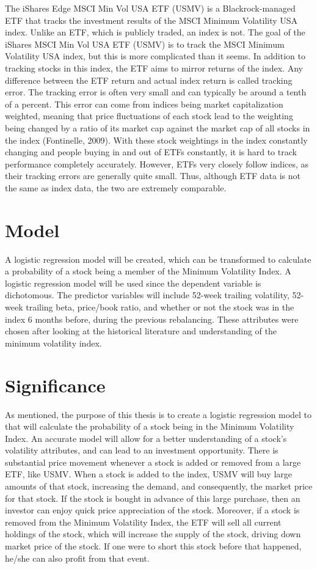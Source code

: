 \documentclass[12pt,twoside]{reedthesis}
\theoremstyle{definition}
\theoremstyle{definition}
\theoremstyle{definition}
\theoremstyle{remark}
\begin{document}
The iShares Edge MSCI Min Vol USA ETF (USMV) is a Blackrock-managed ETF
that tracks the investment results of the MSCI Minimum Volatility USA
index. Unlike an ETF, which is publicly traded, an index is not. The
goal of the iShares MSCI Min Vol USA ETF (USMV) is to track the MSCI
Minimum Volatility USA index, but this is more complicated than it
seems. In addition to tracking stocks in this index, the ETF aims to
mirror returns of the index. Any difference between the ETF return and
actual index return is called tracking error. The tracking error is
often very small and can typically be around a tenth of a percent. This
error can come from indices being market capitalization weighted,
meaning that price fluctuations of each stock lead to the weighting
being changed by a ratio of its market cap against the market cap of all
stocks in the index (Fontinelle, 2009). With these stock weightings in
the index constantly changing and people buying in and out of ETFs
constantly, it is hard to track performance completely accurately.
However, ETFs very closely follow indices, as their tracking errors are
generally quite small. Thus, although ETF data is not the same as index
data, the two are extremely comparable.

\section{Model}\label{model}

A logistic regression model will be created, which can be transformed to
calculate a probability of a stock being a member of the Minimum
Volatility Index. A logistic regression model will be used since the
dependent variable is dichotomous. The predictor variables will include
52-week trailing volatility, 52-week trailing beta, price/book ratio,
and whether or not the stock was in the index 6 months before, during
the previous rebalancing. These attributes were chosen after looking at
the historical literature and understanding of the minimum volatility
index.

\section{Significance}\label{significance}

As mentioned, the purpose of this thesis is to create a logistic
regression model to that will calculate the probability of a stock being
in the Minimum Volatility Index. An accurate model will allow for a
better understanding of a stock's volatility attributes, and can lead to
an investment opportunity. There is substantial price movement whenever
a stock is added or removed from a large ETF, like USMV. When a stock is
added to the index, USMV will buy large amounts of that stock,
increasing the demand, and consequently, the market price for that
stock. If the stock is bought in advance of this large purchase, then an
investor can enjoy quick price appreciation of the stock. Moreover, if a
stock is removed from the Minimum Volatility Index, the ETF will sell
all current holdings of the stock, which will increase the supply of the
stock, driving down market price of the stock. If one were to short this
stock before that happened, he/she can also profit from that event.
\end{document}
